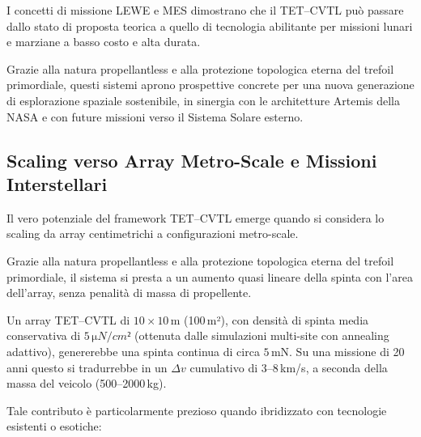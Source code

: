 \documentclass[11pt,a4paper]{article}
\theoremstyle{plain}
\theoremstyle{definition}
\begin{document}
\vspace{0.2cm}

I concetti di missione LEWE e MES dimostrano che il TET--CVTL può passare dallo stato di proposta teorica a quello di tecnologia abilitante per missioni lunari e marziane a basso costo e alta durata. 

\vspace{0.2cm}


Grazie alla natura propellantless e alla protezione topologica eterna del trefoil primordiale, questi sistemi aprono prospettive concrete per una nuova generazione di esplorazione spaziale sostenibile, in sinergia con le architetture Artemis della NASA e con future missioni verso il Sistema Solare esterno.







\subsection{Scaling verso Array Metro-Scale e Missioni Interstellari}

\vspace{0.2cm}

Il vero potenziale del framework TET--CVTL emerge quando si considera lo scaling da array centimetrichi a configurazioni metro-scale. 


\vspace{0.2cm}

Grazie alla natura propellantless e alla protezione topologica eterna del trefoil primordiale, il sistema si presta a un aumento quasi lineare della spinta con l’area dell’array, senza penalità di massa di propellente.


\vspace{0.2cm}

Un array TET--CVTL di $10 \times 10$\,m (100\,m²), con densità di spinta media conservativa di $5\,\si{\micro N/cm²}$ (ottenuta dalle simulazioni multi-site con annealing adattivo), genererebbe una spinta continua di circa $5$\,mN. Su una missione di 20 anni questo si tradurrebbe in un $\Delta v$ cumulativo di $3$–$8$\,km/s, a seconda della massa del veicolo (500–2000\,kg).



\vspace{0.2cm}

Tale contributo è particolarmente prezioso quando ibridizzato con tecnologie esistenti o esotiche:
\end{document}
